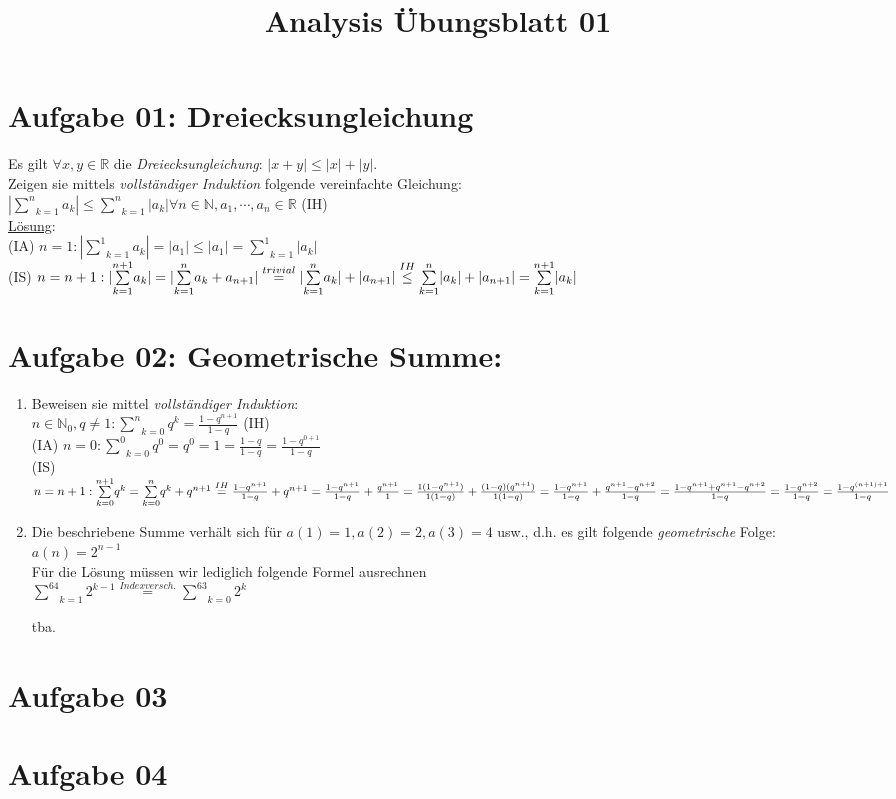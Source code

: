\documentclass[a4paper,11pt]{article}
\title{Analysis Übungsblatt 01}
\begin{document}
\maketitle

\section{Aufgabe 01: Dreiecksungleichung}
Es gilt $\forall x,y\in\mathbb{R}$ die \emph{Dreiecksungleichung}: $|x+y|\leq|x|+|y|$.\\
Zeigen sie mittels \emph{vollständiger Induktion} folgende vereinfachte Gleichung:\\
$|\underset{k=1}{\overset{n}{\sum}}a_k|\leq\underset{k=1}{\overset{n}{\sum}}|a_k|\forall n\in\mathbb{N},a_1,\cdots,a_n\in\mathbb{R}$ (IH)\\
\underline{Lösung}:\\
(IA) $n=1: |\underset{k=1}{\overset{1}{\sum}}a_k|=|a_1|\leq|a_1|=\underset{k=1}{\overset{1}{\sum}}|a_k|$\\
(IS) $n=n+1:|\underset{k=1}{\overset{n+1}{\sum}}a_k|=|\underset{k=1}{\overset{n}{\sum}}a_k+a_{n+1}|\overset{trivial}{=}|\underset{k=1}{\overset{n}{\sum}}a_k|+|a_{n+1}|\\
\overset{IH}{\leq}\underset{k=1}{\overset{n}{\sum}}|a_k|+|a_{n+1}|=\underset{k=1}{\overset{n+1}{\sum}}|a_k|$
\section{Aufgabe 02: Geometrische Summe:}
\begin{enumerate}[label={\alph*)}]
	\item Beweisen sie mittel \emph{vollständiger Induktion}:\\
		$n\in\mathbb{N}_0,q\neq1:\underset{k=0}{\overset{n}{\sum}}q^k=\frac{1-q^{n+1}}{1-q}$ (IH)\\
		(IA) $n=0:\underset{k=0}{\overset{0}{\sum}}q^0=q^0=1=\frac{1-q}{1-q}=\frac{1-q^{0+1}}{1-q}$\\
		(IS) $n=n+1:\underset{k=0}{\overset{n+1}{\sum}}q^k=\underset{k=0}{\overset{n}{\sum}}q^k+q^{n+1}\overset{IH}{=}\frac{1-q^{n+1}}{1-q}+q^{n+1}\\
		=\frac{1-q^{n+1}}{1-q}+\frac{q^{n+1}}{1}=\frac{1(1-q^{n+1})}{1(1-q)}+\frac{(1-q)(q^{n+1})}{1(1-q)}\\
		=\frac{1-q^{n+1}}{1-q}+\frac{q^{n+1}-q^{n+2}}{1-q}=\frac{1-q^{n+1}+q^{n+1}-q^{n+2}}{1-q}=\frac{1-q^{n+2}}{1-q}=\frac{1-q^{(n+1)+1}}{1-q}$
	\item Die beschriebene Summe verhält sich für $a(1)=1, a(2)=2, a(3)=4$ usw., d.h. es gilt folgende \emph{geometrische} Folge: $a(n)=2^{n-1}$\\
		Für die Lösung müssen wir lediglich folgende Formel ausrechnen\\
		$\underset{k=1}{\overset{64}{\sum}}2^{k-1}\overset{Indexversch.}{=}\underset{k=0}{\overset{63}{\sum}}2^k$

		tba.
\end{enumerate}
\section{Aufgabe 03}
\section{Aufgabe 04}
\end{document}
